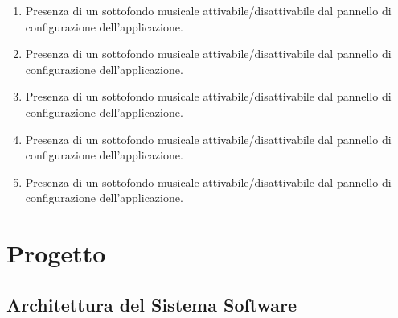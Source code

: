 \documentclass[12pt,a4paper]{report}
\begin{document}
\begin{enumerate}
  \item Presenza di un sottofondo musicale attivabile/disattivabile dal pannello di configurazione dell'applicazione.
  \item Presenza di un sottofondo musicale attivabile/disattivabile dal pannello di configurazione dell'applicazione.
  \item Presenza di un sottofondo musicale attivabile/disattivabile dal pannello di configurazione dell'applicazione.
  \item Presenza di un sottofondo musicale attivabile/disattivabile dal pannello di configurazione dell'applicazione.
  \item Presenza di un sottofondo musicale attivabile/disattivabile dal pannello di configurazione dell'applicazione.
\end{enumerate}



\chapter{Progetto}\label{ch:prog}
\lipsum[9]

\section{Architettura del Sistema Software}\label{ch:arch}
\lipsum[10]
\end{document}
